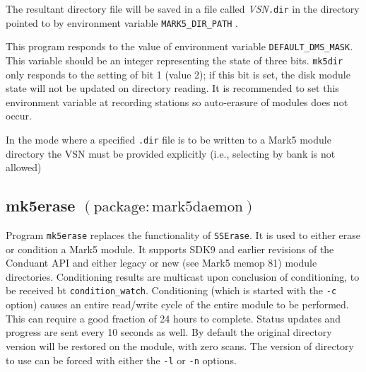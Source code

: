 \noindent
The resultant directory file will be saved in a file called {\em VSN}{\tt .dir} in the directory pointed to by environment variable {\tt MARK5\_DIR\_PATH} .

This program responds to the value of environment variable {\tt DEFAULT\_DMS\_MASK}.
This variable should be an integer representing the state of three bits.
{\tt mk5dir} only responds to the setting of bit 1 (value 2); if this bit is set, the disk module state will not be updated on directory reading.
It is recommended to set this environment variable at recording stations so auto-erasure of modules does not occur.

In the mode where a specified {\tt .dir} file is to be written to a Mark5 module directory the VSN must be provided explicitly (i.e., selecting by bank is not allowed)







\subsection{mk5erase {\small $\mathrm{(package: mark5daemon)}$}} \label{sec:mk5erase}

Program {\tt mk5erase} replaces the functionality of {\tt SSErase}.
It is used to either erase or condition a Mark5 module.  It supports SDK9 and
earlier revisions of the Conduant API and either legacy or new (see Mark5 memop 81) module directories.
Conditioning results are multicast upon conclusion of conditioning, to be received bt {\tt condition\_watch}.
Conditioning (which is started with the {\tt -c} option) causes an entire read/write cycle of the entire module to be performed.
This can require a good fraction of 24 hours to complete.
Status updates and progress are sent every 10 seconds as well.
By default the original directory version will be restored on the module, with zero scans.
The version of directory to use can be forced with either the {\tt -l} or {\tt -n} options.

